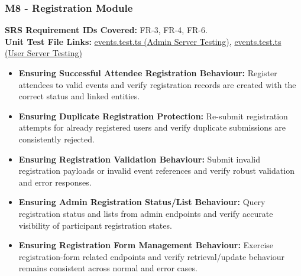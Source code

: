 \documentclass[12pt, titlepage]{article}
\begin{document}
\subsubsection{M8 - Registration Module}
\textbf{SRS Requirement IDs Covered:} FR-3, FR-4, FR-6.
\\
\textbf{Unit Test File Links:} \href{https://github.com/VirochaanRG/MES-Event-Management-System/blob/main/test/Server%20API%20Testing/Admin%20Server%20Testing/events.test.ts}{events.test.ts (Admin Server Testing)}, \href{https://github.com/VirochaanRG/MES-Event-Management-System/blob/main/test/Server%20API%20Testing/User%20Server%20Testing/events.test.ts}{events.test.ts (User Server Testing)}
\begin{itemize}
  \item \textbf{Ensuring Successful Attendee Registration Behaviour:} Register attendees to valid events and verify registration records are created with the correct status and linked entities.
  \item \textbf{Ensuring Duplicate Registration Protection:} Re-submit registration attempts for already registered users and verify duplicate submissions are consistently rejected.
  \item \textbf{Ensuring Registration Validation Behaviour:} Submit invalid registration payloads or invalid event references and verify robust validation and error responses.
  \item \textbf{Ensuring Admin Registration Status/List Behaviour:} Query registration status and lists from admin endpoints and verify accurate visibility of participant registration states.
  \item \textbf{Ensuring Registration Form Management Behaviour:} Exercise registration-form related endpoints and verify retrieval/update behaviour remains consistent across normal and error cases.
\end{itemize}
\end{document}
